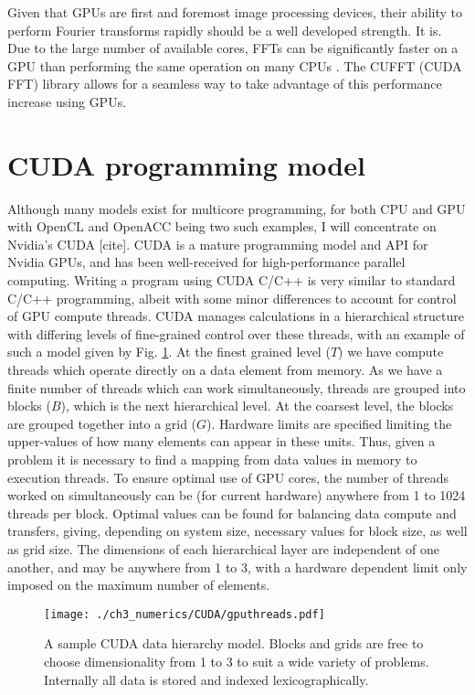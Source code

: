 Given that GPUs are first and foremost image processing devices, their ability to perform Fourier transforms rapidly should be a well developed strength. It is. Due to the large number of available cores, FFTs can be significantly faster on a GPU than performing the same operation on many CPUs \cite{AO:Morgan_ORiordan_pra_2013}. The CUFFT (CUDA FFT) library allows for a seamless way to take advantage of this performance increase using GPUs.

\section{CUDA programming model}
Although many models exist for multicore programming, for both CPU and GPU with OpenCL and OpenACC being two such examples, I will concentrate on Nvidia's CUDA [cite]. CUDA is a mature programming model and API for Nvidia GPUs, and has been well-received for high-performance parallel computing. Writing a program using CUDA C/C++ is very similar to standard C/C++ programming, albeit with some minor differences to account for control of GPU compute threads. CUDA manages calculations in a hierarchical structure with differing levels of fine-grained control over these threads, with an example of such a model given by Fig. \ref{fig:gpu_threads}. At the finest grained level ($T$) we have compute threads which operate directly on a data element from memory. As we have a finite number of threads which can work simultaneously, threads are grouped into blocks ($B$), which is the next hierarchical level. At the coarsest level, the blocks are grouped together into a grid ($G$). Hardware limits are specified limiting the upper-values of how many elements can appear in these units. Thus, given a problem it is necessary to find a mapping from data values in memory to execution threads. To ensure optimal use of GPU cores, the number of threads worked on simultaneously can be (for current hardware) anywhere from 1 to 1024 threads per block. Optimal values can be found for balancing data compute and transfers, giving, depending on system size, necessary values for block size, as well as grid size. The dimensions of each hierarchical layer are independent of one another, and may be anywhere from 1 to 3, with a hardware dependent limit only imposed on the maximum number of elements.

\begin{figure}[tb]
    \centering
    \texttt{[image: ./ch3\_numerics/CUDA/gputhreads.pdf]}
    \caption{A sample CUDA data hierarchy model. Blocks and grids are free to choose dimensionality from 1 to 3 to suit a wide variety of problems. Internally all data is stored and indexed lexicographically.}
    \label{fig:gpu_threads}
\end{figure}

